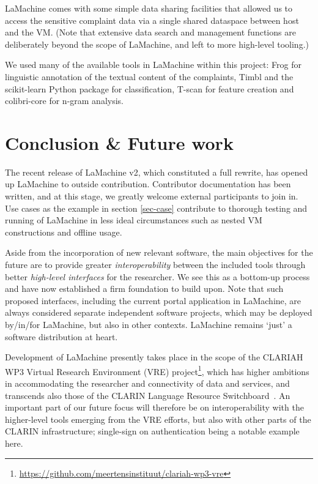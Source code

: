 \documentclass[a4paper,11pt]{article}
\begin{document}
LaMachine comes with some simple data sharing facilities that allowed us to access the sensitive complaint data via a single shared dataspace between host and the VM. (Note that extensive data search and management functions are deliberately beyond the scope of LaMachine, and left to more high-level tooling.)

We used many of the available tools in LaMachine within this project: Frog for linguistic annotation of the textual content of the complaints, Timbl and the scikit-learn Python package \cite{scikit-learn} for classification, T-scan for feature creation and colibri-core for n-gram analysis.



\section{Conclusion \& Future work}

The recent release of LaMachine v2, which constituted a full rewrite, has opened up LaMachine to outside
contribution. Contributor documentation has been written, and at this stage, we greatly welcome external participants
to join in. Use cases as the example in section \ref{sec-case} contribute to thorough testing and running of LaMachine in less ideal circumstances such as nested VM constructions and offline usage.

Aside from the incorporation of new relevant software, the main objectives for the future are to provide
greater \emph{interoperability} between the included tools through better \emph{high-level interfaces} for the
researcher. We see this as a bottom-up process and have now established a firm foundation to build upon. Note that such
proposed interfaces, including the current portal application in LaMachine, are always considered separate independent
software projects, which may be deployed by/in/for LaMachine, but also in other contexts. LaMachine remains `just'
a software distribution at heart.

Development of LaMachine presently takes place in the scope of the CLARIAH WP3 Virtual Research Environment (VRE)
project\footnote{\url{https://github.com/meertensinstituut/clariah-wp3-vre}}, which has higher ambitions in
accommodating the researcher and connectivity of data and services, and transcends also those of the CLARIN Language
Resource Switchboard~\cite{switchboard}. An important part of our future focus will therefore be on interoperability
with the higher-level tools emerging from the VRE efforts, but also with other parts of the CLARIN infrastructure;
single-sign on authentication being a notable example here.
\end{document}
